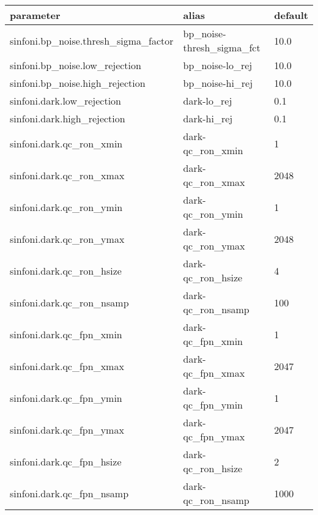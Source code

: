 \begin{longtable}{|*3{l|}}
\hline
parameter                               & alias                      & default \\
\hline
sinfoni.bp\_noise.thresh\_sigma\_factor & bp\_noise-thresh\_sigma\_fct &  10.0 \\
sinfoni.bp\_noise.low\_rejection        & bp\_noise-lo\_rej           &  10.0 \\
sinfoni.bp\_noise.high\_rejection       & bp\_noise-hi\_rej           &  10.0 \\
sinfoni.dark.low\_rejection             & dark-lo\_rej                 &  0.1  \\
sinfoni.dark.high\_rejection            & dark-hi\_rej                 &  0.1  \\
sinfoni.dark.qc\_ron\_xmin              & dark-qc\_ron\_xmin           &  1    \\
sinfoni.dark.qc\_ron\_xmax              & dark-qc\_ron\_xmax           &  2048 \\
sinfoni.dark.qc\_ron\_ymin              & dark-qc\_ron\_ymin           &  1    \\
sinfoni.dark.qc\_ron\_ymax              & dark-qc\_ron\_ymax           &  2048 \\
sinfoni.dark.qc\_ron\_hsize             & dark-qc\_ron\_hsize          &  4    \\
sinfoni.dark.qc\_ron\_nsamp             & dark-qc\_ron\_nsamp          &  100  \\
sinfoni.dark.qc\_fpn\_xmin              & dark-qc\_fpn\_xmin           &  1  \\
sinfoni.dark.qc\_fpn\_xmax              & dark-qc\_fpn\_xmax           &  2047 \\
sinfoni.dark.qc\_fpn\_ymin              & dark-qc\_fpn\_ymin           &  1 \\
sinfoni.dark.qc\_fpn\_ymax              & dark-qc\_fpn\_ymax           &  2047 \\
sinfoni.dark.qc\_fpn\_hsize             & dark-qc\_ron\_hsize          &  2    \\
sinfoni.dark.qc\_fpn\_nsamp             & dark-qc\_ron\_nsamp          &  1000 \\
\hline
\end{longtable}

